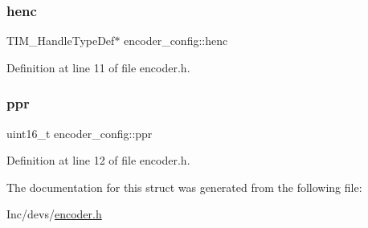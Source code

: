 \subsubsection{\texorpdfstring{henc}{henc}}
{\footnotesize\ttfamily T\+I\+M\+\_\+\+Handle\+Type\+Def$\ast$ encoder\+\_\+config\+::henc}



Definition at line 11 of file encoder.\+h.

\mbox{\label{structencoder__config_afb9cd180fa1749a182f6178a4f417280}} 
\subsubsection{\texorpdfstring{ppr}{ppr}}
{\footnotesize\ttfamily uint16\+\_\+t encoder\+\_\+config\+::ppr}



Definition at line 12 of file encoder.\+h.



The documentation for this struct was generated from the following file\+:\begin{DoxyCompactItemize}
\item 
Inc/devs/\mbox{\hyperlink{encoder_8h}{encoder.\+h}}\end{DoxyCompactItemize}
